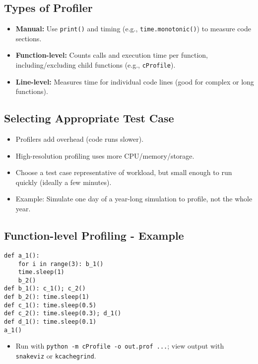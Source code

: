 \documentclass[11pt,a4paper]{article}
\begin{document}
\subsection*{Types of Profiler}
\begin{itemize}
    \item \textbf{Manual:} Use \texttt{print()} and timing (e.g., \texttt{time.monotonic()}) to measure code sections.
    \item \textbf{Function-level:} Counts calls and execution time per function, including/excluding child functions (e.g., \texttt{cProfile}).
    \item \textbf{Line-level:} Measures time for individual code lines (good for complex or long functions).
\end{itemize}

\subsection*{Selecting Appropriate Test Case}
\begin{itemize}
    \item Profilers add overhead (code runs slower).
    \item High-resolution profiling uses more CPU/memory/storage.
    \item Choose a test case representative of workload, but small enough to run quickly (ideally a few minutes).
    \item Example: Simulate one day of a year-long simulation to profile, not the whole year.
\end{itemize}

\subsection*{Function-level Profiling - Example}
\begin{verbatim}
def a_1():
    for i in range(3): b_1()
    time.sleep(1)
    b_2()
def b_1(): c_1(); c_2()
def b_2(): time.sleep(1)
def c_1(): time.sleep(0.5)
def c_2(): time.sleep(0.3); d_1()
def d_1(): time.sleep(0.1)
a_1()
\end{verbatim}
\begin{itemize}
    \item Run with \texttt{python -m cProfile -o out.prof ...}; view output with \texttt{snakeviz} or \texttt{kcachegrind}.
\end{itemize}
\end{document}
